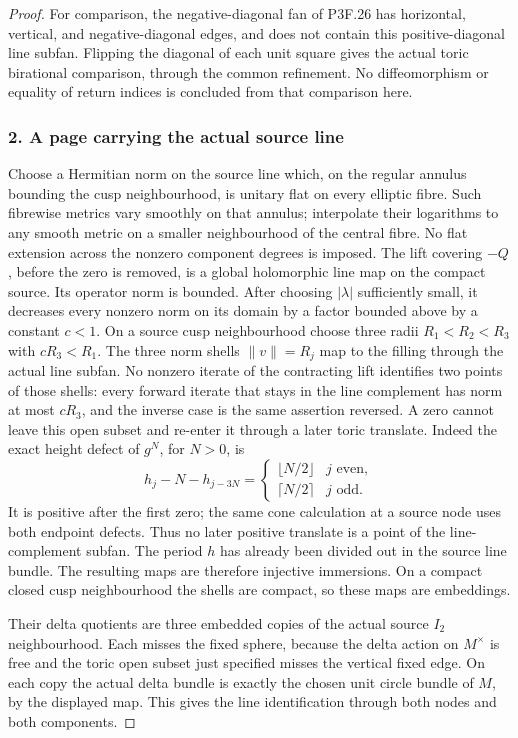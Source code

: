 \begin{proof}
For comparison, the negative-diagonal fan of P3F.26 has horizontal, vertical, and negative-diagonal edges, and does not contain this positive-diagonal line subfan. Flipping the diagonal of each unit square gives the actual toric birational comparison, through the common refinement. No diffeomorphism or equality of return indices is concluded from that comparison here.

\subsubsection{2. A page carrying the actual source line}\label{a-page-carrying-the-actual-source-line}

Choose a Hermitian norm on the source line which, on the regular annulus bounding the cusp neighbourhood, is unitary flat on every elliptic fibre. Such fibrewise metrics vary smoothly on that annulus; interpolate their logarithms to any smooth metric on a smaller neighbourhood of the central fibre. No flat extension across the nonzero component degrees is imposed. The lift covering \(-Q\), before the zero is removed, is a global holomorphic line map on the compact source. Its operator norm is bounded. After choosing \(|\lambda|\) sufficiently small, it decreases every nonzero norm on its domain by a factor bounded above by a constant \(c<1\). On a source cusp neighbourhood choose three radii \(R_1<R_2<R_3\) with \(cR_3<R_1\). The three norm shells \(\|v\|=R_j\) map to the filling through the actual line subfan. No nonzero iterate of the contracting lift identifies two points of those shells: every forward iterate that stays in the line complement has norm at most \(cR_3\), and the inverse case is the same assertion reversed. A zero cannot leave this open subset and re-enter it through a later toric translate. Indeed the exact height defect of \(g^N\), for \(N>0\), is \[
 h_j-N-h_{j-3N}=
 \begin{cases}\lfloor N/2\rfloor&j\text{ even},\\
 \lceil N/2\rceil&j\text{ odd}.
 \end{cases}
\] It is positive after the first zero; the same cone calculation at a source node uses both endpoint defects. Thus no later positive translate is a point of the line-complement subfan. The period \(h\) has already been divided out in the source line bundle. The resulting maps are therefore injective immersions. On a compact closed cusp neighbourhood the shells are compact, so these maps are embeddings.

Their delta quotients are three embedded copies of the actual source \(I_2\) neighbourhood. Each misses the fixed sphere, because the delta action on \(M^\times\) is free and the toric open subset just specified misses the vertical fixed edge. On each copy the actual delta bundle is exactly the chosen unit circle bundle of \(M\), by the displayed map. This gives the line identification through both nodes and both components.


\end{proof}
